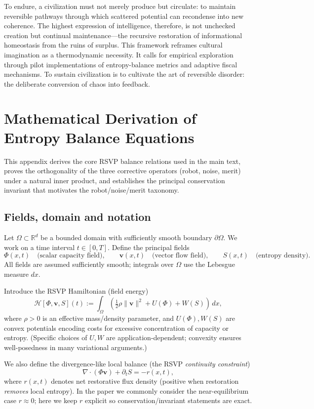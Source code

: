 \documentclass[12pt]{article}
\begin{document}
To endure, a civilization must not merely produce but circulate: to maintain reversible pathways through which scattered potential can recondense into new coherence.  
The highest expression of intelligence, therefore, is not unchecked creation but continual maintenance—the recursive restoration of informational homeostasis from the ruins of surplus.  
This framework reframes cultural imagination as a thermodynamic necessity.  
It calls for empirical exploration through pilot implementations of entropy-balance metrics and adaptive fiscal mechanisms.  
To sustain civilization is to cultivate the art of reversible disorder: the deliberate conversion of chaos into feedback.


\appendix

\section{Mathematical Derivation of Entropy Balance Equations}
\label{appendix:derivation}

This appendix derives the core RSVP balance relations used in the main text, proves the orthogonality of the three corrective operators (robot, noise, merit) under a natural inner product, and establishes the principal conservation invariant that motivates the robot/noise/merit taxonomy.

\subsection{Fields, domain and notation}
Let $\Omega\subset\mathbb{R}^d$ be a bounded domain with sufficiently smooth boundary $\partial\Omega$.  
We work on a time interval $t\in[0,T]$. Define the principal fields
\[
\Phi(x,t)\quad\text{(scalar capacity field)},\qquad
\mathbf v(x,t)\quad\text{(vector flow field)},\qquad
S(x,t)\quad\text{(entropy density)}.
\]
All fields are assumed sufficiently smooth; integrals over $\Omega$ use the Lebesgue measure $dx$.

Introduce the RSVP Hamiltonian (field energy)
\[
\mathcal H[\Phi,\mathbf v,S](t)
:=\int_{\Omega}\left(\tfrac{1}{2}\rho\|\mathbf v\|^2 + U(\Phi)+W(S)\right)\,dx,
\]
where $\rho>0$ is an effective mass/density parameter, and $U(\Phi),W(S)$ are convex potentials encoding costs for excessive concentration of capacity or entropy. (Specific choices of $U,W$ are application-dependent; convexity ensures well-posedness in many variational arguments.)

We also define the divergence-like local balance (the RSVP \emph{continuity constraint})
\begin{equation}
\label{eq:continuity-general}
\nabla\!\cdot(\Phi\mathbf v) + \partial_t S = -r(x,t),
\end{equation}
where $r(x,t)$ denotes net restorative flux density (positive when restoration \emph{removes} local entropy). In the paper we commonly consider the near-equilibrium case $r\approx 0$; here we keep $r$ explicit so conservation/invariant statements are exact.
\end{document}
